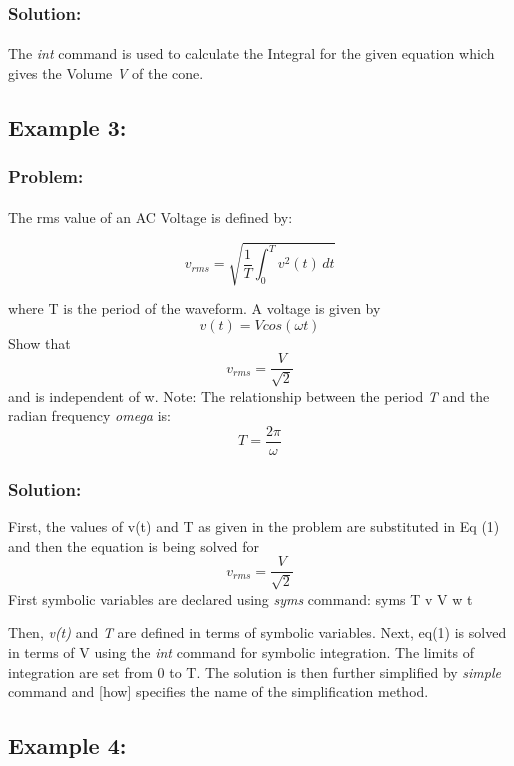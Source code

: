 \documentclass[]{article}
\begin{document}
\subsubsection{Solution:}
\paragraph{}
The \emph{int} command is used to calculate the Integral for the given equation which gives the Volume \emph{V} of the cone.

\subsection{Example 3:  }
\subsubsection{Problem:}
\paragraph{}
The rms value of an AC Voltage is defined by:

\begin{equation} 
 v_{rms} = \sqrt{\frac{1}{T}\int_0^T v^2(t)\,dt}
\end{equation}


where T is the period of the waveform.
A voltage is given by
\[
 v(t) = Vcos(\omega t)
\]
Show that 
\[
v_{rms} = \frac{V}{\sqrt2} 
\]
and is independent of w.
Note: The relationship between the period \emph{T} and the radian frequency \emph{omega} is: 
\[
T = \frac{2\pi}{\omega}
\]

\subsubsection{Solution:}
First, the values of v(t) and T as given in the problem are substituted in Eq (1) and then the equation is being solved for 
\[
v_{rms} = \frac{V}{\sqrt2} 
\]
First symbolic variables are declared using \emph{syms} command:
syms T v V w t

Then, \emph{v(t)} and \emph{T} are defined in terms of symbolic variables. Next, eq(1) is solved in terms of V using the \emph{int} command for symbolic integration. The limits of integration are set from 0 to T. The solution is then further simplified by \emph{simple} command and [how] specifies the name of the simplification method.

\subsection{Example 4:  }
\end{document}
